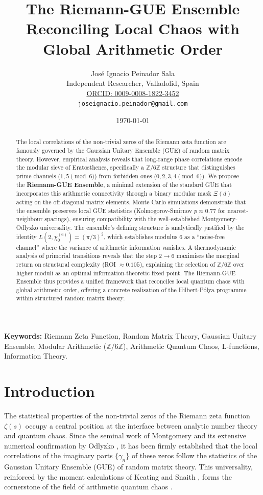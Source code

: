 \documentclass[12pt,a4paper]{article}
\title{\textbf{The Riemann-GUE Ensemble}\\[0.5em]
\large Reconciling Local Chaos with Global Arithmetic Order}
\author{José Ignacio Peinador Sala\\
\small Independent Researcher, Valladolid, Spain\\
\small \href{https://orcid.org/0009-0008-1822-3452}{ORCID: 0009-0008-1822-3452}\\
\small \texttt{joseignacio.peinador@gmail.com}}
\date{\today}
\theoremstyle{plain}
\theoremstyle{definition}
\theoremstyle{remark}
\begin{document}
\maketitle

\begin{abstract}
The local correlations of the non-trivial zeros of the Riemann zeta function are famously governed by the Gaussian Unitary Ensemble (GUE) of random matrix theory. However, empirical analysis reveals that long-range phase correlations encode the modular sieve of Eratosthenes, specifically a $\mathbb{Z}/6\mathbb{Z}$ structure that distinguishes prime channels ($1,5 \pmod{6}$) from forbidden ones ($0,2,3,4 \pmod{6}$). We propose the \textbf{Riemann-GUE Ensemble}, a minimal extension of the standard GUE that incorporates this arithmetic connectivity through a binary modular mask $\Xi(d)$ acting on the off-diagonal matrix elements. Monte Carlo simulations demonstrate that the ensemble preserves local GUE statistics (Kolmogorov-Smirnov $p \approx 0.77$ for nearest-neighbour spacings), ensuring compatibility with the well-established Montgomery-Odlyzko universality. The ensemble's defining structure is analytically justified by the identity $L(2,\chi_0^{(6)}) = (\pi/3)^2$, which establishes modulus $6$ as a ``noise-free channel'' where the variance of arithmetic information vanishes. A thermodynamic analysis of primorial transitions reveals that the step $2 \to 6$ maximises the marginal return on structural complexity (ROI $\approx 0.105$), explaining the selection of $\mathbb{Z}/6\mathbb{Z}$ over higher moduli as an optimal information-theoretic fixed point. The Riemann-GUE Ensemble thus provides a unified framework that reconciles local quantum chaos with global arithmetic order, offering a concrete realisation of the Hilbert-Pólya programme within structured random matrix theory.
\end{abstract}
\vspace{1em}
\noindent\textbf{Keywords:} Riemann Zeta Function, Random Matrix Theory, Gaussian Unitary Ensemble, Modular Arithmetic ($\mathbb{Z}/6\mathbb{Z}$), Arithmetic Quantum Chaos, L-functions, Information Theory.

\section{Introduction}
\label{sec:introduction}

The statistical properties of the non-trivial zeros of the Riemann zeta function $\zeta(s)$ occupy a central position at the interface between analytic number theory and quantum chaos. Since the seminal work of Montgomery \cite{montgomery1973} and its extensive numerical confirmation by Odlyzko \cite{odlyzko2001}, it has been firmly established that the local correlations of the imaginary parts $\{\gamma_n\}$ of these zeros follow the statistics of the Gaussian Unitary Ensemble (GUE) of random matrix theory. This universality, reinforced by the moment calculations of Keating and Snaith \cite{keatingsnaith2000}, forms the cornerstone of the field of arithmetic quantum chaos \cite{katzsarnak1999, sarnak1999}.
\end{document}
